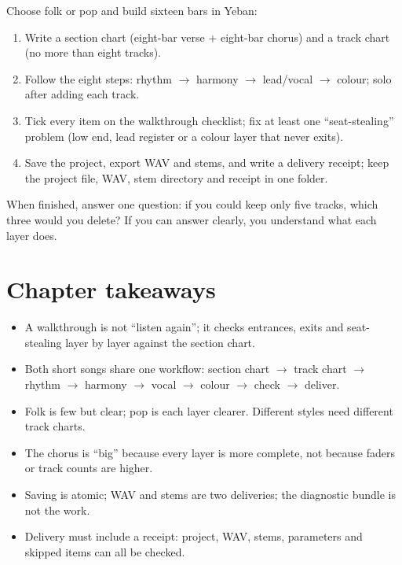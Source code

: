 \begin{exercise}
Choose folk or pop and build sixteen bars in Yeban:
\begin{enumerate}
\item Write a section chart (eight-bar verse + eight-bar chorus) and a track chart (no more than eight tracks).
\item Follow the eight steps: rhythm $\rightarrow$ harmony $\rightarrow$ lead/vocal $\rightarrow$ colour; solo after adding each track.
\item Tick every item on the walkthrough checklist; fix at least one ``seat-stealing'' problem (low end, lead register or a colour layer that never exits).
\item Save the project, export WAV and stems, and write a delivery receipt; keep the project file, WAV, stem directory and receipt in one folder.
\end{enumerate}
When finished, answer one question: if you could keep only five tracks, which three would you delete? If you can answer clearly, you understand what each layer does.
\end{exercise}

\section{Chapter takeaways}
\label{sec:walkthrough-takeaways}

\begin{itemize}
\item A walkthrough is not ``listen again''; it checks entrances, exits and seat-stealing layer by layer against the section chart.
\item Both short songs share one workflow: section chart $\rightarrow$ track chart $\rightarrow$ rhythm $\rightarrow$ harmony $\rightarrow$ vocal $\rightarrow$ colour $\rightarrow$ check $\rightarrow$ deliver.
\item Folk is few but clear; pop is each layer clearer. Different styles need different track charts.
\item The chorus is ``big'' because every layer is more complete, not because faders or track counts are higher.
\item Saving is atomic; WAV and stems are two deliveries; the diagnostic bundle is not the work.
\item Delivery must include a receipt: project, WAV, stems, parameters and skipped items can all be checked.
\end{itemize}

